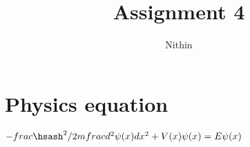 
\title{Assignment 4}
\author{Nithin}
\maketitle
\section{Physics equation}
 $-frac{\hsash^2}/{2m}frac{d^2\psi(x)}{dx^2}+V(x)\psi(x)=E\psi(x)$

